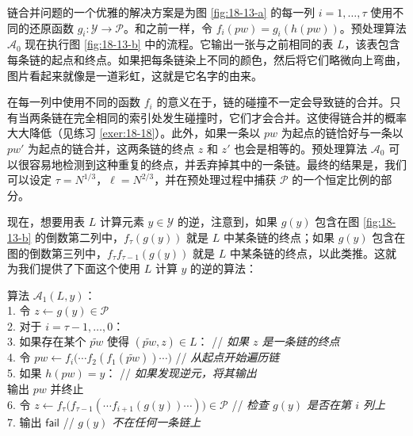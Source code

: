 \begin{snote}[彩虹表。]
链合并问题的一个优雅的解决方案是为图 \ref{fig:18-13-a} 的每一列 $i=1,\dots,\tau$ 使用不同的还原函数 $g_i:\mathcal{Y}\to\mathcal{P}$。和之前一样，令 $f_i(pw)= g_i(h(pw))$。预处理算法 $\mathcal{A}_0$ 现在执行图 \ref{fig:18-13-b} 中的流程。它输出一张与之前相同的表 $L$，该表包含每条链的起点和终点。如果把每条链染上不同的颜色，然后将它们略微向上弯曲，图片看起来就像是一道彩虹，这就是它名字的由来。

在每一列中使用不同的函数 $f_i$ 的意义在于，链的碰撞不一定会导致链的合并。只有当两条链在完全相同的索引处发生碰撞时，它们才会合并。这使得链合并的概率大大降低（见练习 \ref{exer:18-18}）。此外，如果一条以 $pw$ 为起点的链恰好与一条以 $pw'$ 为起点的链合并，这两条链的终点 $z$ 和 $z'$ 也会是相等的。预处理算法 $\mathcal{A}_0$ 可以很容易地检测到这种重复的终点，并丢弃掉其中的一条链。最终的结果是，我们可以设定 $\tau=N^{1/3}$，$\ell=N^{2/3}$，并在预处理过程中捕获 $\mathcal{P}$ 的一个恒定比例的部分。

现在，想要用表 $L$ 计算元素 $y\in\mathcal{Y}$ 的逆，注意到，如果 $g(y)$ 包含在图 \ref{fig:18-13-b} 的倒数第二列中，$f_\tau(g(y))$ 就是 $L$ 中某条链的终点；如果 $g(y)$ 包含在图的倒数第三列中，$f_{\tau}f_{\tau-1}(g(y))$ 就是 $L$ 中某条链的终点，以此类推。这就为我们提供了下面这个使用 $L$ 计算 $y$ 的逆的算法：

\vspace*{10pt}

\hspace*{5pt} 算法 $\mathcal{A}_1(L,y)$：\\
\hspace*{26pt} 1. \quad 令 $z\leftarrow g(y)\in\mathcal{P}$\\
\hspace*{26pt} 2. \quad 对于 $i=\tau-1,\dots,0$：\\
\hspace*{26pt} 3. \quad\qquad 如果存在某个 $\widetilde{pw}$ 使得 $(\widetilde{pw},z)\in L$：
\hspace*{40pt} // \emph{如果 $z$ 是一条链的终点} \\
\hspace*{26pt} 4. \quad\qquad\qquad 令 $pw\leftarrow f_i\big(\cdots f_2(f_1(\widetilde{pw}))\cdots\big)$
\hspace*{43pt} // \emph{从起点开始遍历链} \\
\hspace*{26pt} 5. \quad\qquad\qquad 如果 $h(pw)=y$：
\hspace*{107pt} // \emph{如果发现逆元，将其输出} \\
\hspace*{116pt} 输出 $pw$ 并终止\\
\hspace*{26pt} 6. \quad\qquad 令 $z\leftarrow f_{\tau}\big(f_{\tau-1}(\cdots f_{i+1}(g(y))\cdots)\big) \in\mathcal{P}$
\hspace*{25pt} // \emph{检查 $g(y)$ 是否在第 $i$ 列上} \\
\hspace*{26pt} 7. \quad 输出 $\mathsf{fail}$
\hspace*{188.5pt} // \emph{$g(y)$ 不在任何一条链上}


\end{snote}
